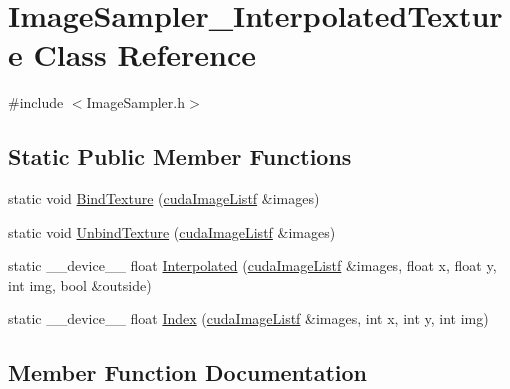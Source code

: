 \hypertarget{class_image_sampler___interpolated_texture}{}\section{Image\+Sampler\+\_\+\+Interpolated\+Texture Class Reference}
\label{class_image_sampler___interpolated_texture}


{\ttfamily \#include $<$Image\+Sampler.\+h$>$}

\subsection*{Static Public Member Functions}
\begin{DoxyCompactItemize}
\item 
static void \hyperlink{class_image_sampler___interpolated_texture_adc69b3f5ec38ed7fdfe3f8cd0a94fb64}{Bind\+Texture} (\hyperlink{_queued_c_u_d_a_tracker_8h_a84de79f5d4b6e4c8d5622fe712c1bd69}{cuda\+Image\+Listf} \&images)
\item 
static void \hyperlink{class_image_sampler___interpolated_texture_a42e9ea516f12fdebb8e00459e7223ece}{Unbind\+Texture} (\hyperlink{_queued_c_u_d_a_tracker_8h_a84de79f5d4b6e4c8d5622fe712c1bd69}{cuda\+Image\+Listf} \&images)
\item 
static \+\_\+\+\_\+device\+\_\+\+\_\+ float \hyperlink{class_image_sampler___interpolated_texture_af5855aa4719094f61aed595bfcfef99f}{Interpolated} (\hyperlink{_queued_c_u_d_a_tracker_8h_a84de79f5d4b6e4c8d5622fe712c1bd69}{cuda\+Image\+Listf} \&images, float x, float y, int img, bool \&outside)
\item 
static \+\_\+\+\_\+device\+\_\+\+\_\+ float \hyperlink{class_image_sampler___interpolated_texture_a015b3cb6e76967a2873739de232950d2}{Index} (\hyperlink{_queued_c_u_d_a_tracker_8h_a84de79f5d4b6e4c8d5622fe712c1bd69}{cuda\+Image\+Listf} \&images, int x, int y, int img)
\end{DoxyCompactItemize}


\subsection{Member Function Documentation}
